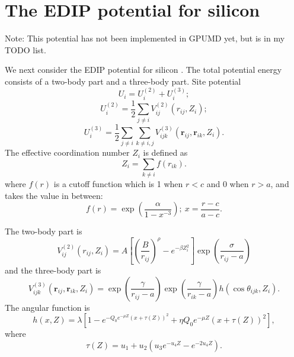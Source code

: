 \documentclass[12pt,a4paper]{report}
\newcommand{\vect}[1]{\boldsymbol{#1}}
\begin{document}
\section{The EDIP potential for silicon}


Note: This potential has not been implemented in GPUMD yet, but is in my TODO list.

We next consider the EDIP potential for silicon \cite{bazant1997prb,justo1998prb}. The total potential energy consists of a two-body part and a three-body part. Site potential
\begin{equation}
U_i = U_i^{(2)} + U_i^{(3)};
\end{equation}
\begin{equation}
U_i^{(2)} = \frac{1}{2}\sum_{j\neq i} V^{(2)}_{ij}(r_{ij}, Z_i);
\end{equation}
\begin{equation}
U_i^{(3)} = \frac{1}{2}\sum_{j\neq i}\sum_{k\neq i,j}  V^{(3)}_{ijk} \left(\vect{r}_{ij}, \vect{r}_{ik},  Z_i \right).
\end{equation}
The effective coordination number $Z_i$ is defined as
\begin{equation}
Z_i = \sum_{k\neq i} f(r_{ik}).
\end{equation}
where $f(r)$ is a cutoff function which is 1 when $r<c$ and 0 when $r>a$, and takes the value in between:
\begin{equation}
f(r) = \exp\left( \frac{\alpha}{1-x^{-3}}\right); ~ x = \frac{r-c}{a-c}.
\end{equation}

The two-body part is
\begin{equation}
V^{(2)}_{ij}(r_{ij},Z_i) =  A
\left[ \left( \frac{B }{ r_{ij} } \right)^{\rho}- e^{-\beta Z_i^2} \right]
\exp\left(   \frac{\sigma}{ r_{ij} - a} \right)
\end{equation}
and the three-body part is
\begin{equation}
V^{(3)}_{ijk}(\vect{r}_{ij}, \vect{r}_{ik}, Z_i) =
\exp\left(   \frac{\gamma}{ r_{ij} - a} \right)
\exp\left(   \frac{\gamma}{ r_{ik} - a} \right)
h \left(\cos \theta_{ijk} , Z_i \right).
\end{equation}
The angular function is
\begin{equation}
h \left(x , Z \right) =
\lambda \left[1 - e^{ -Q_0 e^{-\mu Z} (x + \tau(Z))^2}  + \eta Q_0 e^{-\mu Z} (x + \tau(Z))^2 \right],
\end{equation}
where
\begin{equation}
\tau(Z) = u_1 + u_2(u_3 e^{-u_4 Z} - e^{-2u_4 Z} ).
\end{equation}
\end{document}
